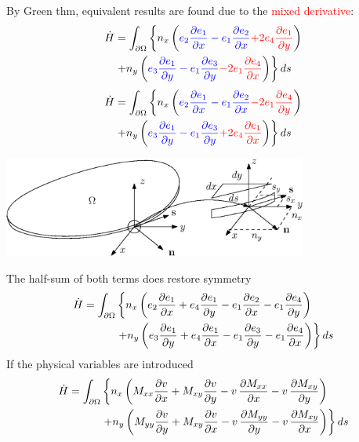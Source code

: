 \documentclass{beamer}
\begin{document}
\begin{frame}
By Green thm, equivalent results are found due to the \textcolor{red}{mixed derivative}:
\begin{multline*}
\dot{H} = \int_{\partial \Omega} \left\{ n_x \left(\textcolor{blue}{ e_2 \diffp{e_1}{x} - e_1 \diffp{e_2}{x} }  \textcolor{red}{+ 2 e_4 \diffp{e_1}{y}} \right) \right.\\ \left. + n_y \left(\textcolor{blue}{e_3 \diffp{e_1}{y} - e_1 \diffp{e_3}{y}} \textcolor{red}{-2 e_1 \diffp{e_4}{x} } \right) \right\} ds
\end{multline*}	
\begin{multline*}
\dot{H} = \int_{\partial \Omega} \left\{ n_x \left(\textcolor{blue}{ e_2 \diffp{e_1}{x} - e_1 \diffp{e_2}{x} } \textcolor{red}{ - 2 e_1 \diffp{e_4}{y} }\right) \right.\\ \left. + n_y \left( \textcolor{blue}{ e_3 \diffp{e_1}{y} - e_1 \diffp{e_3}{y} } \textcolor{red}{ + 2 e_4 \diffp{e_1}{x}}\right) \right\} ds
\end{multline*}
\begin{tcolorbox}
	\centering
	\includegraphics[width=0.75\textwidth]{Plate_ref.eps}
\end{tcolorbox}
\end{frame}

\begin{frame}{}
The half-sum of both terms does restore symmetry 
\begin{align*}
\dot{H} = \int_{\partial \Omega}  & \left\{  n_x \left(e_2 \diffp{e_1}{x}  + e_4 \diffp{e_1}{y}  - e_1 \diffp{e_2}{x} - e_1 \diffp{e_4}{y}\right)
\right. \nonumber \\
&   \left. +n_y \left(e_3 \diffp{e_1}{y} + e_4 \diffp{e_1}{x} - e_1 \diffp{e_3}{y} - e_1 \diffp{e_4}{x} \right) \right\} ds
\end{align*}
If the physical variables are introduced 
\begin{align*}
\dot{H} = \int_{\partial \Omega}  & \left\{  n_x \left(M_{xx} \diffp{v}{x} + M_{xy} \diffp{v}{y} - v \, \diffp{M_{xx} }{x}   - v \, \diffp{M_{xy}}{y}\right)
\right.  \nonumber\\
&  \left. +n_y \left(M_{yy} \diffp{v}{y} + M_{xy} \diffp{v}{x} - v \, \diffp{M_{yy}}{y} - v\, \diffp{M_{xy}}{x} \right) \right\} ds
\end{align*}

\end{frame}
\end{document}
